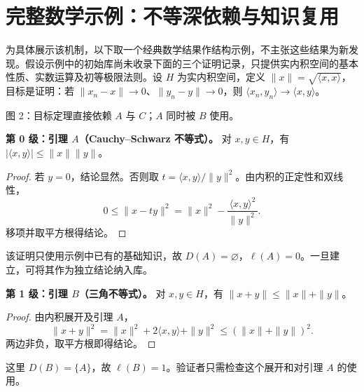 \documentclass[UTF8,11pt,a4paper,fontset=fandol]{ctexart}
\theoremstyle{definition}\newtheorem{definition}{定义}
\begin{document}
\section{完整数学示例：不等深依赖与知识复用}
为具体展示该机制，以下取一个经典数学结果作结构示例，不主张这些结果为新发现。假设示例中的初始库尚未收录下面的三个证明记录，只提供实内积空间的基本性质、实数运算及初等极限法则。设 $H$ 为实内积空间，定义 $\|x\|=\sqrt{\langle x,x\rangle}$，目标是证明：若 $\|x_n-x\|\to0$、$\|y_n-y\|\to0$，则 $\langle x_n,y_n\rangle\to\langle x,y\rangle$。

\begin{center}
\par\small 图 2：目标定理直接依赖 $A$ 与 $C$；$A$ 同时被 $B$ 使用。
\end{center}

\noindent\textbf{第 0 级：引理 $A$（Cauchy--Schwarz 不等式）。} 对 $x,y\in H$，有 $|\langle x,y\rangle|\le\|x\|\|y\|$。
\begin{proof}
若 $y=0$，结论显然。否则取 $t=\langle x,y\rangle/\|y\|^2$。由内积的正定性和双线性，
\[
 0\le\|x-ty\|^2=\|x\|^2-\frac{\langle x,y\rangle^2}{\|y\|^2}.
\]
移项并取平方根得结论。
\end{proof}
该证明只使用示例中已有的基础知识，故 $D(A)=\varnothing$，$\ell(A)=0$。一旦建立，可将其作为独立结论纳入库。

\noindent\textbf{第 1 级：引理 $B$（三角不等式）。} 对 $x,y\in H$，有 $\|x+y\|\le\|x\|+\|y\|$。
\begin{proof}
由内积展开及引理 $A$，
\[
 \|x+y\|^2=\|x\|^2+2\langle x,y\rangle+\|y\|^2
 \le(\|x\|+\|y\|)^2.
\]
两边非负，取平方根即得结论。
\end{proof}
这里 $D(B)=\{A\}$，故 $\ell(B)=1$。验证者只需检查这个展开和对引理 $A$ 的使用。
\end{document}
